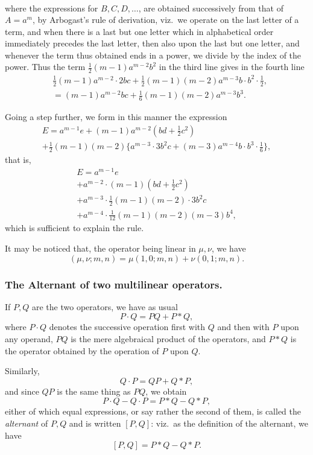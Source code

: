 \documentclass[11pt,a4paper]{book}
\begin{document}
{{{\begin{align*}
\end{align*}
where the expressions for $B, C, D, \ldots$, are obtained successively from that of $A = a^m$,
by Arbogast's rule of derivation, viz.\ we operate on the last letter of a term, and
when there is a last but one letter which in alphabetical order immediately precedes
the last letter, then also upon the last but one letter, and whenever the term thus
obtained ends in a power, we divide by the index of the power. Thus the term
$\frac{1}{2}(m-1)a^{m-2}b^2$ in the third line gives in the fourth line
\begin{align*}
&\tfrac{1}{2}(m-1)a^{m-2} \cdot 2bc + \tfrac{1}{2}(m-1)(m-2)a^{m-3}b \cdot b^2 \cdot \tfrac{1}{2}, \\
&= (m-1)a^{m-2}bc + \tfrac{1}{6}(m-1)(m-2)a^{m-3}b^3.
\end{align*}

\newpage
\noindent Going a step further, we form in this manner the expression
\begin{multline*}
E = a^{m-1}e + (m-1)a^{m-2}(bd + \tfrac{1}{2}c^2) \\
+ \tfrac{1}{2}(m-1)(m-2)\{a^{m-3} \cdot 3b^2c + (m-3)a^{m-4}b \cdot b^3 \cdot \tfrac{1}{6}\},
\end{multline*}
that is,
\begin{multline*}
E = a^{m-1}e \\
+ a^{m-2} \cdot (m-1)(bd + \tfrac{1}{2}c^2) \\
+ a^{m-3} \cdot \tfrac{1}{2}(m-1)(m-2) \cdot 3b^2c \\
+ a^{m-4} \cdot \tfrac{1}{12}(m-1)(m-2)(m-3)b^4,
\end{multline*}
which is sufficient to explain the rule.

It may be noticed that, the operator being linear in $\mu, \nu$, we have
\[
(\mu, \nu; m, n) = \mu(1, 0; m, n) + \nu(0, 1; m, n).
\]

\subsubsection*{The Alternant of two multilinear operators.}

If $P, Q$ are the two operators, we have as usual
\[
P \cdot Q = PQ + P * Q,
\]
where $P \cdot Q$ denotes the successive operation first with $Q$ and then with $P$ upon any
operand, $PQ$ is the mere algebraical product of the operators, and $P * Q$ is the operator
obtained by the operation of $P$ upon $Q$.

Similarly,
\[
Q \cdot P = QP + Q * P,
\]
and since $QP$ is the same thing as $PQ$, we obtain
\[
P \cdot Q - Q \cdot P = P * Q - Q * P,
\]
either of which equal expressions, or say rather the second of them, is called the
\textit{alternant} of $P, Q$ and is written $[P, Q]$: viz.\ as the definition of the alternant, we have
\[
[P, Q] = P * Q - Q * P.
\]

}}}
\end{document}
